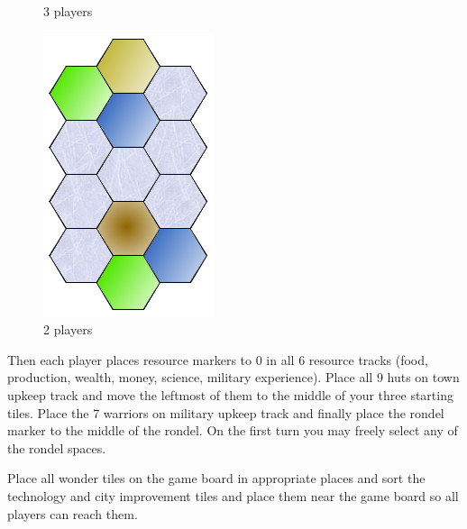 \documentclass[11pt,a4paper,titlepage]{article}
\begin{document}
{\begin{figure}[!htb]
\begin{minipage}[c]{0.4\textwidth}
      \captionsetup{labelformat=empty}
      \caption{3 players}
    \end{minipage}\hfill
    \begin{minipage}[c]{0.2\textwidth}
      \includegraphics[scale=.5]{doe_2p_setup.png}
      \captionsetup{labelformat=empty}
      \caption{2 players}
    \end{minipage}\hfill
    \label{fig:tech_sailing}
  \end{figure}

  Then each player places resource markers to 0 in all 6 resource tracks
  (food, production, wealth, money, science, military experience).
  Place all 9 huts on town upkeep track and move the leftmost of them
  to the middle of your three starting tiles.
  Place the 7 warriors on military upkeep track
  and finally place the rondel marker to the middle of the rondel. On the
  first turn you may freely select any of the rondel spaces.

  Place all wonder tiles on the game board in appropriate places and sort
  the technology and city improvement tiles and place them near the game
  board so all players can reach them.
}\label{sec:preparation}
\end{document}
